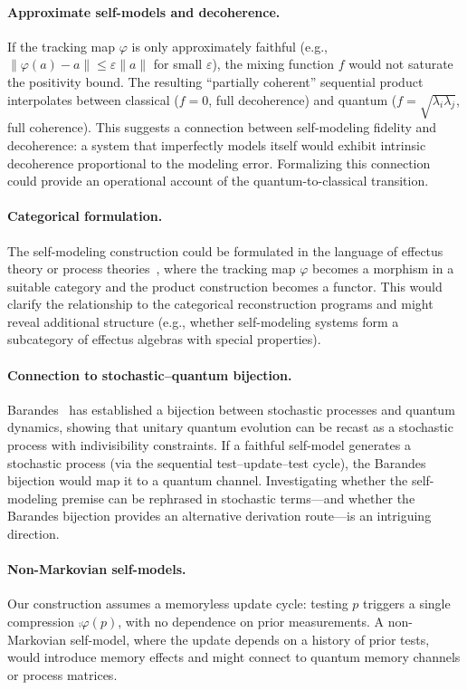 \paragraph{Approximate self-models and decoherence.}
If the tracking map $\varphi$ is only approximately faithful (e.g.,
$\|\varphi(a) - a\| \leq \varepsilon\|a\|$ for small
$\varepsilon$), the mixing function $f$ would not saturate the
positivity bound.  The resulting ``partially coherent'' sequential
product interpolates between classical ($f = 0$, full decoherence) and
quantum ($f = \sqrt{\lambda_{i}\lambda_{j}}$, full coherence).  This
suggests a connection between self-modeling fidelity and decoherence:
a system that imperfectly models itself would exhibit intrinsic
decoherence proportional to the modeling error.  Formalizing this
connection could provide an operational account of the
quantum-to-classical transition.

\paragraph{Categorical formulation.}
The self-modeling construction could be formulated in the language of
effectus theory or process
theories~\cite{SelbyScandaloCoecke2021}, where the tracking
map $\varphi$ becomes a morphism in a suitable category and the
product construction becomes a functor.  This would clarify the
relationship to the categorical reconstruction programs and might
reveal additional structure (e.g., whether self-modeling systems form a
subcategory of effectus algebras with special properties).

\paragraph{Connection to stochastic--quantum bijection.}
Barandes~\cite{Barandes2025} has established a bijection between
stochastic processes and quantum dynamics, showing that unitary quantum
evolution can be recast as a stochastic process with indivisibility
constraints.  If a faithful self-model generates a stochastic process
(via the sequential test--update--test cycle), the Barandes bijection
would map it to a quantum channel.  Investigating whether the
self-modeling premise can be rephrased in stochastic terms---and
whether the Barandes bijection provides an alternative derivation
route---is an intriguing direction.

\paragraph{Non-Markovian self-models.}
Our construction assumes a memoryless update cycle: testing $p$
triggers a single compression $\comp{\varphi(p)}$, with no dependence
on prior measurements.  A non-Markovian self-model, where the update
depends on a history of prior tests, would introduce memory effects
and might connect to quantum memory channels or process matrices.


